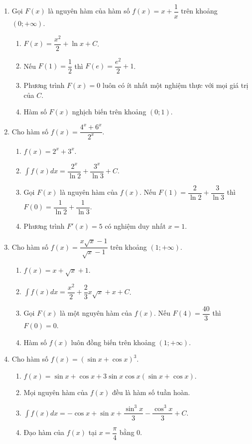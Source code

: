 \documentclass[12pt]{article}
\begin{document}
\begin{enumerate}[label=\textbf{Câu \arabic*.}, start=1]
		\item Gọi $F(x)$ là nguyên hàm của hàm số $f(x) = x + \dfrac{1}{x}$ trên khoảng $(0; +\infty)$.
		\begin{enumerate}[label=\alph*)]
			\item $F(x) = \dfrac{x^2}{2} + \ln x + C$.
			\item Nếu $F(1) = \dfrac{1}{2}$ thì $F(e) = \dfrac{e^2}{2} + 1$.
			\item Phương trình $F(x) = 0$ luôn có ít nhất một nghiệm thực với mọi giá trị của $C$.
			\item Hàm số $F(x)$ nghịch biến trên khoảng $(0; 1)$.
		\end{enumerate}
		
		\item Cho hàm số $f(x) = \dfrac{4^x + 6^x}{2^x}$.
		\begin{enumerate}[label=\alph*)]
			\item $f(x) = 2^x + 3^x$.
			\item $\displaystyle \int f(x) dx = \dfrac{2^x}{\ln 2} + \dfrac{3^x}{\ln 3} + C$.
			\item Gọi $F(x)$ là nguyên hàm của $f(x)$. Nếu $F(1) = \dfrac{2}{\ln 2} + \dfrac{3}{\ln 3}$ thì $F(0) = \dfrac{1}{\ln 2} + \dfrac{1}{\ln 3}$.
			\item Phương trình $F'(x) = 5$ có nghiệm duy nhất $x = 1$.
		\end{enumerate}
		
		\item Cho hàm số $f(x) = \dfrac{x\sqrt{x} - 1}{\sqrt{x} - 1}$ trên khoảng $(1; +\infty)$.
		\begin{enumerate}[label=\alph*)]
			\item $f(x) = x + \sqrt{x} + 1$.
			\item $\displaystyle \int f(x) dx = \dfrac{x^2}{2} + \dfrac{2}{3}x\sqrt{x} + x + C$.
			\item Gọi $F(x)$ là một nguyên hàm của $f(x)$. Nếu $F(4) = \dfrac{40}{3}$ thì $F(0) = 0$.
			\item Hàm số $f(x)$ luôn đồng biến trên khoảng $(1; +\infty)$.
		\end{enumerate}
		
		\item Cho hàm số $f(x) = (\sin x + \cos x)^3$.
		\begin{enumerate}[label=\alph*)]
			\item $f(x) = \sin x + \cos x + 3\sin x \cos x (\sin x + \cos x)$.
			\item Mọi nguyên hàm của $f(x)$ đều là hàm số tuần hoàn.
			\item $\displaystyle \int f(x) dx = -\cos x + \sin x + \dfrac{\sin^3 x}{3} - \dfrac{\cos^3 x}{3} + C$.
			\item Đạo hàm của $f(x)$ tại $x = \dfrac{\pi}{4}$ bằng $0$.
		\end{enumerate}
		

\end{enumerate}
\end{document}
